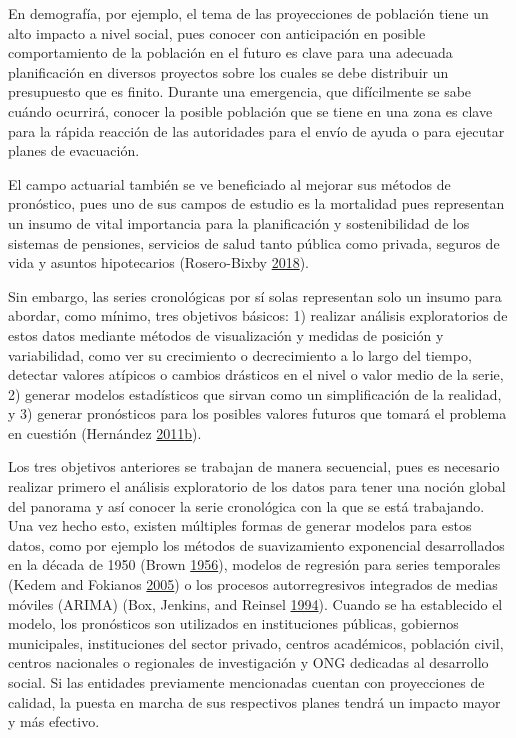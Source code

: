 \documentclass[]{article}
\begin{document}
En demografía, por ejemplo, el tema de las proyecciones de población
tiene un alto impacto a nivel social, pues conocer con anticipación en
posible comportamiento de la población en el futuro es clave para una
adecuada planificación en diversos proyectos sobre los cuales se debe
distribuir un presupuesto que es finito. Durante una emergencia, que
difícilmente se sabe cuándo ocurrirá, conocer la posible población que
se tiene en una zona es clave para la rápida reacción de las autoridades
para el envío de ayuda o para ejecutar planes de evacuación.

El campo actuarial también se ve beneficiado al mejorar sus métodos de
pronóstico, pues uno de sus campos de estudio es la mortalidad pues
representan un insumo de vital importancia para la planificación y
sostenibilidad de los sistemas de pensiones, servicios de salud tanto
pública como privada, seguros de vida y asuntos hipotecarios
(Rosero-Bixby \protect\hyperlink{ref-supenprodc}{2018}).

Sin embargo, las series cronológicas por sí solas representan solo un
insumo para abordar, como mínimo, tres objetivos básicos: 1) realizar
análisis exploratorios de estos datos mediante métodos de visualización
y medidas de posición y variabilidad, como ver su crecimiento o
decrecimiento a lo largo del tiempo, detectar valores atípicos o cambios
drásticos en el nivel o valor medio de la serie, 2) generar modelos
estadísticos que sirvan como un simplificación de la realidad, y 3)
generar pronósticos para los posibles valores futuros que tomará el
problema en cuestión (Hernández
\protect\hyperlink{ref-oscarh-2}{2011}\protect\hyperlink{ref-oscarh-2}{b}).

Los tres objetivos anteriores se trabajan de manera secuencial, pues es
necesario realizar primero el análisis exploratorio de los datos para
tener una noción global del panorama y así conocer la serie cronológica
con la que se está trabajando. Una vez hecho esto, existen múltiples
formas de generar modelos para estos datos, como por ejemplo los métodos
de suavizamiento exponencial desarrollados en la década de 1950 (Brown
\protect\hyperlink{ref-brown}{1956}), modelos de regresión para series
temporales (Kedem and Fokianos \protect\hyperlink{ref-kedem}{2005}) o
los procesos autorregresivos integrados de medias móviles (ARIMA) (Box,
Jenkins, and Reinsel \protect\hyperlink{ref-box-jenkins}{1994}). Cuando
se ha establecido el modelo, los pronósticos son utilizados en
instituciones públicas, gobiernos municipales, instituciones del sector
privado, centros académicos, población civil, centros nacionales o
regionales de investigación y ONG dedicadas al desarrollo social. Si las
entidades previamente mencionadas cuentan con proyecciones de calidad,
la puesta en marcha de sus respectivos planes tendrá un impacto mayor y
más efectivo.
\end{document}
